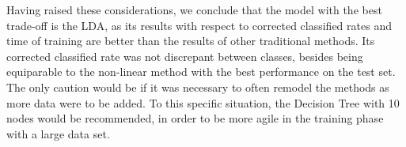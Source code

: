 \documentclass[conference]{IEEEtran}
\begin{document}
Having raised these considerations, we conclude that the model with the best
trade-off is the LDA, as its results with respect to corrected classified rates and 
time of training are better than the results of other traditional methods. Its 
corrected classified rate was not discrepant between classes, besides being equiparable 
to the non-linear method with the best performance on the test set. The only caution would 
be if it was necessary to often remodel the methods as more data were to be added.
To this specific situation, the Decision Tree with 10 nodes would be recommended, in order to be 
more agile in the training phase with a large data set. 





\end{document}
